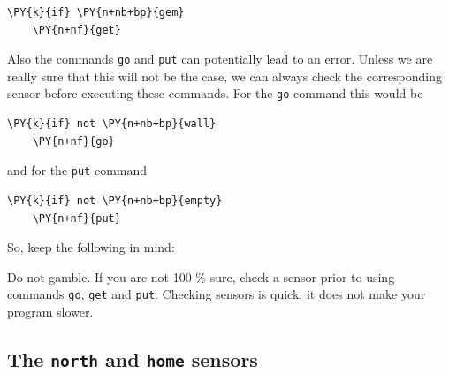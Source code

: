 \begin{bbox}
\begin{Verbatim}[commandchars=\\\{\}]
\PY{k}{if} \PY{n+nb+bp}{gem}
    \PY{n+nf}{get}
\end{Verbatim}
\end{bbox}
\vspace{6mm}

\noindent
Also the commands {\tt go} and {\tt put} can potentially lead to 
an error. Unless we are really sure that this will not be the case, 
we can always check the corresponding sensor before executing these 
commands. For the {\tt go} command this would be\\

\begin{bbox}
\begin{Verbatim}[commandchars=\\\{\}]
\PY{k}{if} not \PY{n+nb+bp}{wall}
    \PY{n+nf}{go}
\end{Verbatim}
\end{bbox}
\vspace{6mm}

\noindent
and for the {\tt put} command\\

\begin{bbox}
\begin{Verbatim}[commandchars=\\\{\}]
\PY{k}{if} not \PY{n+nb+bp}{empty}
    \PY{n+nf}{put}
\end{Verbatim}
\end{bbox}
\vspace{6mm}

\noindent
So, keep the following in mind:\\

\begin{gbox}
\begin{center}
Do not gamble. If you are not 100 \% sure, check a sensor prior to using 
commands {\tt go}, {\tt get} and {\tt put}. Checking sensors is quick, 
it does not make your program slower.
\end{center}
\end{gbox}
\vspace{6mm}


\subsection{The {\tt north} and {\tt home} sensors}

